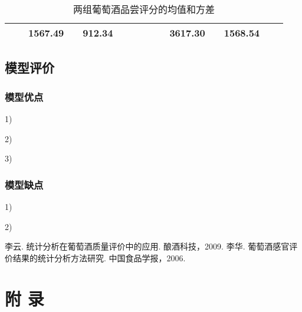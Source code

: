 \documentclass{cumcmart}
\begin{document}
\begin{table}[!htbp]
\begin{tabular}{ccccccccccccccc}
        \midrule
                &          & 1567.49  &  & 912.34  &         &       &        &     &          &   3617.30 &   & 1568.54  &           &         \\
        \bottomrule
        \end{tabular}
        \caption{两组葡萄酒品尝评分的均值和方差}
    \end{table}
 

    \subsection{模型评价}

        \subsubsection{模型优点}
1)	

2)	

3)	

        \subsubsection{模型缺点}
1)	

2)	



\begin{thebibliography}{10}

 李云. 统计分析在葡萄酒质量评价中的应用. 酿酒科技，2009.
 李华. 葡萄酒感官评价结果的统计分析方法研究. 中国食品学报，2006.

\end{thebibliography}


\newpage
\appendix
\section*{附 \quad 录}
\end{document}
